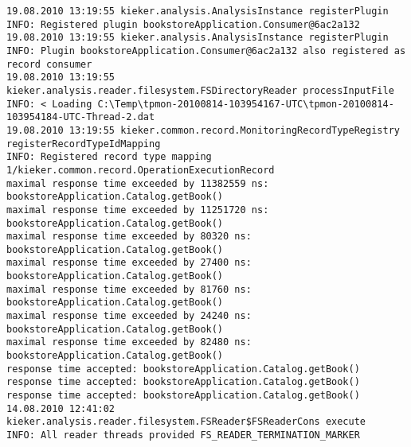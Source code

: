 \setBashListing
\begin{lstlisting}
19.08.2010 13:19:55 kieker.analysis.AnalysisInstance registerPlugin
INFO: Registered plugin bookstoreApplication.Consumer@6ac2a132
19.08.2010 13:19:55 kieker.analysis.AnalysisInstance registerPlugin
INFO: Plugin bookstoreApplication.Consumer@6ac2a132 also registered as record consumer
19.08.2010 13:19:55 kieker.analysis.reader.filesystem.FSDirectoryReader processInputFile
INFO: < Loading C:\Temp\tpmon-20100814-103954167-UTC\tpmon-20100814-103954184-UTC-Thread-2.dat
19.08.2010 13:19:55 kieker.common.record.MonitoringRecordTypeRegistry registerRecordTypeIdMapping
INFO: Registered record type mapping 1/kieker.common.record.OperationExecutionRecord
maximal response time exceeded by 11382559 ns: bookstoreApplication.Catalog.getBook()
maximal response time exceeded by 11251720 ns: bookstoreApplication.Catalog.getBook()
maximal response time exceeded by 80320 ns: bookstoreApplication.Catalog.getBook()
maximal response time exceeded by 27400 ns: bookstoreApplication.Catalog.getBook()
maximal response time exceeded by 81760 ns: bookstoreApplication.Catalog.getBook()
maximal response time exceeded by 24240 ns: bookstoreApplication.Catalog.getBook()
maximal response time exceeded by 82480 ns: bookstoreApplication.Catalog.getBook()
response time accepted: bookstoreApplication.Catalog.getBook()
response time accepted: bookstoreApplication.Catalog.getBook()
response time accepted: bookstoreApplication.Catalog.getBook()
14.08.2010 12:41:02 kieker.analysis.reader.filesystem.FSReader$FSReaderCons execute
INFO: All reader threads provided FS_READER_TERMINATION_MARKER
\end{lstlisting}